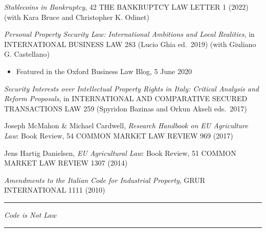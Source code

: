 \documentclass[
  11pt,
  letterpaper]{article}
\begin{document}
\vspace{0.5em}\noindent\textit{Stablecoins in Bankruptcy}, 42
{\fontsize{9.5}{11}\selectfont\MakeUppercase{The Bankruptcy Law Letter}}
1 (2022) (with Kara Bruce and Christopher K. Odinet)

\vspace{0.5em}\noindent\textit{Personal Property Security Law: International Ambitions and Local Realities},
in
{\fontsize{9.5}{11}\selectfont\MakeUppercase{International Business Law}}
283 (Lucio Ghia ed.~2019) (with Giuliano G. Castellano)

\begin{itemize}
\item Featured in the Oxford Business Law Blog, 5 June 2020
\end{itemize}

\vspace{0.5em}\noindent\textit{Security Interests over Intellectual Property Rights in Italy: Critical Analysis and Reform Proposals},
in
{\fontsize{9.5}{11}\selectfont\MakeUppercase{International and Comparative Secured Transactions Law}}
259 (Spyridon Bazinas and Orkun Akseli eds.~2017)

\vspace{0.5em}\noindent Joseph McMahon \& Michael Cardwell,
\textit{Research Handbook on EU Agriculture Law}: Book Review, 54
{\fontsize{9.5}{11}\selectfont\MakeUppercase{Common Market Law Review}}
969 (2017)

\vspace{0.5em}\noindent Jens Hartig Danielsen,
\textit{EU Agricultural Law}: Book Review, 51
{\fontsize{9.5}{11}\selectfont\MakeUppercase{Common Market Law Review}}
1307 (2014)

\vspace{0.5em}\noindent\textit{Amendments to the Italian Code for Industrial Property},
{\fontsize{9.5}{11}\selectfont\MakeUppercase{GRUR International}} 1111
(2010)

\vspace{0.25em}\hrule\vspace{0.7em}

\noindent\textit{Code is Not Law}

\vspace{0.25em}\hrule\vspace{0.7em}
\end{document}
